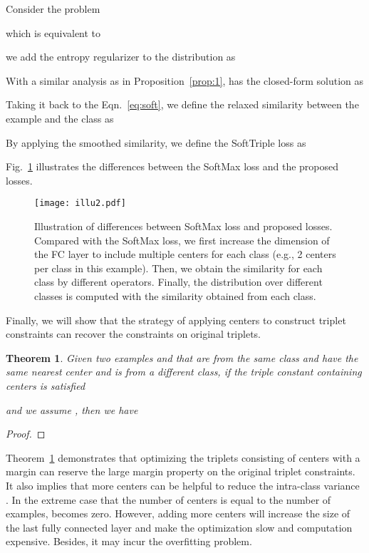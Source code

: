 \documentclass[10pt,twocolumn,letterpaper]{article}
\newtheorem{thm}{Theorem}
\begin{document}
Consider the problem

which is equivalent to

we add the entropy regularizer to the distribution  as

With a similar analysis as in Proposition~\ref{prop:1},  has the closed-form solution as

Taking it back to the Eqn.~\ref{eq:soft}, we define the relaxed similarity between the example  and the class  as


By applying the smoothed similarity, we define the SoftTriple loss as


Fig.~\ref{fig:illu2} illustrates the differences between the SoftMax loss and the proposed losses. 
\begin{figure}[!ht]
\centering
\texttt{[image: illu2.pdf]}
\caption{Illustration of differences between SoftMax loss and proposed losses. Compared with the SoftMax loss, we first increase the dimension of the FC layer to include multiple centers for each class (e.g., 2 centers per class in this example). Then, we obtain the similarity for each class by different operators. Finally, the distribution over different classes is computed with the similarity obtained from each class.\label{fig:illu2}}
\end{figure}

Finally, we will show that the strategy of applying centers to construct triplet constraints can recover the constraints on original triplets. 
\begin{thm}\label{thm:1}
Given two examples  and  that are from the same class and have the same nearest center and  is from a different class, if the triple constant containing centers is satisfied

and we assume , then we have

\end{thm}
\begin{proof}

\end{proof}

Theorem~\ref{thm:1} demonstrates that optimizing the triplets consisting of centers with a margin  can reserve the large margin property on the original triplet constraints. It also implies that more centers can be helpful to reduce the intra-class variance . In the extreme case that the number of centers is equal to the number of examples,  becomes zero. However, adding more centers will increase the size of the last fully connected layer and make the optimization slow and computation expensive. Besides, it may incur the overfitting problem.
\end{document}

